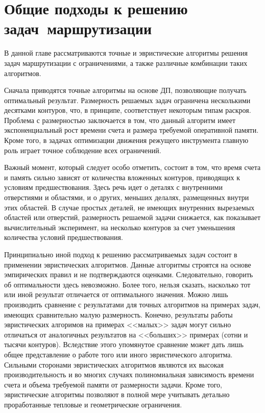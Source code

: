 
\section{
  Общие подходы
  к решению задач~маршрутизации
}
\label{sect:5.1}

В данной главе рассматриваются точные и эвристические алгоритмы решения задач
маршрутизации с ограничениями,
а также различные комбинации таких алгоритмов.

Сначала приводятся точные алгоритмы на основе ДП,
позволяющие получать оптимальный результат.
Размерность решаемых задач ограничена несколькими десятками контуров,
что, в принципе, соответствует некоторым типам раскроя.
Проблема с размерностью заключается в том,
что данный алгоритм имеет экспоненциальный рост времени счета
и размера требуемой оперативной памяти.
Кроме того, в задачах оптимизации движения режущего инструмента главную роль
играет точное соблюдение всех ограничений.

Важный момент, который следует особо отметить, состоит в том,
что время счета и память сильно зависят от количества вложенных контуров,
приводящих к условиям предшествования.
Здесь речь идет о деталях с внутренними отверстиями
и областями, и о других, меньших делалях, размещенных внутри этих областей.
В случае простых деталей, не имеющих внутренних вырезаемых областей или отверстий,
размерность решаемой задачи снижается,
как показывает вычислительный эксперимент,
на несколько контуров за счет уменьшения количества условий предшествования.

Принципиально иной подход к решению рассматриваемых задач состоит в применении
эвристических алгоритмов.
Данные алгоритмы строятся на основе эмпирических правил и не подтверждаются оценками.
Следовательно, говорить об оптимальности здесь невозможно.
Более того, нельзя сказать,
насколько тот или иной результат отличается от оптимального значения.
Можно лишь производить сравнение с результатами
для точных алгоритмов на примерах задач, имеющих сравнительно малую размерность.
Конечно, результаты работы эвристических алгоримов на примерах <<малых>>
задач могут сильно отличаться от аналогичных результатов на <<больших>> примерах
(сотни и тысячи контуров).
Вследствие этого упомянутое сравнение может дать лишь
общее представление о работе того или иного эвристического алгоритма.
Сильными сторонами эвристических алгоритмов являются их высокая производительность
и во многих случаях полиномиальная зависимость времени счета и объема
требуемой памяти от размерности задачи.
Кроме того, эвристические алгоритмы позволяют в полной мере учитывать
детально проработанные тепловые и геометрические ограничения.

